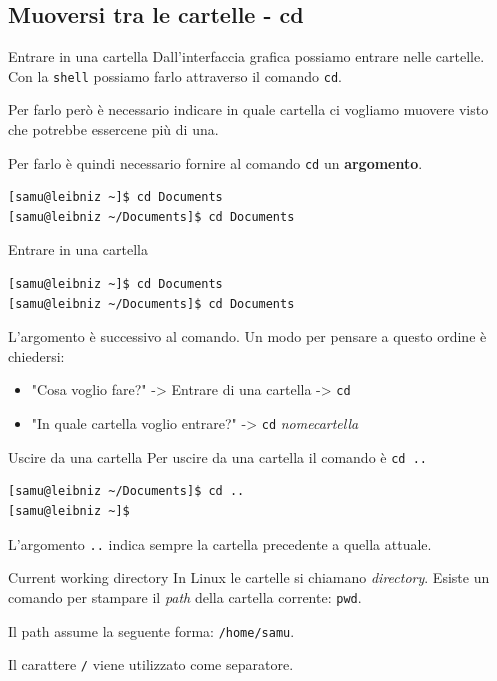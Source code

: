 \documentclass{beamer}
\begin{document}
\subsection{Muoversi tra le cartelle - cd}
\begin{frame}[fragile]{Entrare in una cartella}
  Dall'interfaccia grafica possiamo entrare nelle cartelle. Con la \texttt{shell}
  possiamo farlo attraverso il comando \texttt{cd}.\bigskip

  Per farlo però è necessario indicare in quale cartella ci vogliamo muovere 
  visto che potrebbe essercene più di una.\bigskip

  Per farlo è quindi necessario fornire al comando \texttt{cd} un 
  \textbf{argomento}.\bigskip

    \begin{lstlisting}
[samu@leibniz ~]$ cd Documents
[samu@leibniz ~/Documents]$ cd Documents
    \end{lstlisting}
\end{frame}

\begin{frame}[fragile]{Entrare in una cartella}
    \begin{lstlisting}
[samu@leibniz ~]$ cd Documents
[samu@leibniz ~/Documents]$ cd Documents
    \end{lstlisting}

  L'argomento è successivo al comando. Un modo per pensare a questo ordine è
  chiedersi:\medskip
  
  \begin{itemize}
    \item "Cosa voglio fare?" -> Entrare di una cartella -> \texttt{cd}
    \item "In quale cartella voglio entrare?" -> \texttt{cd} 
      \textit{nomecartella}
  \end{itemize}
\end{frame}

\begin{frame}[fragile]{Uscire da una cartella}
  Per uscire da una cartella il comando è \texttt{cd ..}\bigskip

    \begin{lstlisting}
[samu@leibniz ~/Documents]$ cd ..
[samu@leibniz ~]$
    \end{lstlisting}

  L'argomento \texttt{..} indica sempre la cartella precedente a quella attuale.
\end{frame}

\begin{frame}{Current working directory}
  In Linux le cartelle si chiamano \textit{directory}. Esiste un comando per
  stampare il \textit{path} della cartella corrente: \texttt{pwd}.\bigskip

  Il path assume la seguente forma: \texttt{/home/samu}.\bigskip

  Il carattere \texttt{/} viene utilizzato come separatore.
\end{frame}
\end{document}
